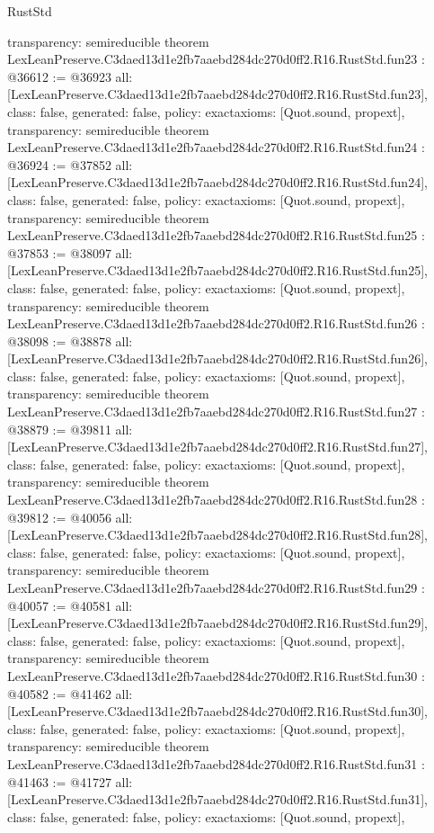 \begin{lexlean}{RustStd}
\begin{coremodule}
{  transparency: semireducible
}
theorem LexLeanPreserve.C3daed13d1e2fb7aaebd284dc270d0ff2.R16.RustStd.fun23 : @36612 := @36923 {
  all: [LexLeanPreserve.C3daed13d1e2fb7aaebd284dc270d0ff2.R16.RustStd.fun23],
  class: false,
  generated: false,
  policy: exact{axioms: [Quot.sound, propext]},
  transparency: semireducible
}
theorem LexLeanPreserve.C3daed13d1e2fb7aaebd284dc270d0ff2.R16.RustStd.fun24 : @36924 := @37852 {
  all: [LexLeanPreserve.C3daed13d1e2fb7aaebd284dc270d0ff2.R16.RustStd.fun24],
  class: false,
  generated: false,
  policy: exact{axioms: [Quot.sound, propext]},
  transparency: semireducible
}
theorem LexLeanPreserve.C3daed13d1e2fb7aaebd284dc270d0ff2.R16.RustStd.fun25 : @37853 := @38097 {
  all: [LexLeanPreserve.C3daed13d1e2fb7aaebd284dc270d0ff2.R16.RustStd.fun25],
  class: false,
  generated: false,
  policy: exact{axioms: [Quot.sound, propext]},
  transparency: semireducible
}
theorem LexLeanPreserve.C3daed13d1e2fb7aaebd284dc270d0ff2.R16.RustStd.fun26 : @38098 := @38878 {
  all: [LexLeanPreserve.C3daed13d1e2fb7aaebd284dc270d0ff2.R16.RustStd.fun26],
  class: false,
  generated: false,
  policy: exact{axioms: [Quot.sound, propext]},
  transparency: semireducible
}
theorem LexLeanPreserve.C3daed13d1e2fb7aaebd284dc270d0ff2.R16.RustStd.fun27 : @38879 := @39811 {
  all: [LexLeanPreserve.C3daed13d1e2fb7aaebd284dc270d0ff2.R16.RustStd.fun27],
  class: false,
  generated: false,
  policy: exact{axioms: [Quot.sound, propext]},
  transparency: semireducible
}
theorem LexLeanPreserve.C3daed13d1e2fb7aaebd284dc270d0ff2.R16.RustStd.fun28 : @39812 := @40056 {
  all: [LexLeanPreserve.C3daed13d1e2fb7aaebd284dc270d0ff2.R16.RustStd.fun28],
  class: false,
  generated: false,
  policy: exact{axioms: [Quot.sound, propext]},
  transparency: semireducible
}
theorem LexLeanPreserve.C3daed13d1e2fb7aaebd284dc270d0ff2.R16.RustStd.fun29 : @40057 := @40581 {
  all: [LexLeanPreserve.C3daed13d1e2fb7aaebd284dc270d0ff2.R16.RustStd.fun29],
  class: false,
  generated: false,
  policy: exact{axioms: [Quot.sound, propext]},
  transparency: semireducible
}
theorem LexLeanPreserve.C3daed13d1e2fb7aaebd284dc270d0ff2.R16.RustStd.fun30 : @40582 := @41462 {
  all: [LexLeanPreserve.C3daed13d1e2fb7aaebd284dc270d0ff2.R16.RustStd.fun30],
  class: false,
  generated: false,
  policy: exact{axioms: [Quot.sound, propext]},
  transparency: semireducible
}
theorem LexLeanPreserve.C3daed13d1e2fb7aaebd284dc270d0ff2.R16.RustStd.fun31 : @41463 := @41727 {
  all: [LexLeanPreserve.C3daed13d1e2fb7aaebd284dc270d0ff2.R16.RustStd.fun31],
  class: false,
  generated: false,
  policy: exact{axioms: [Quot.sound, propext]},
}
\end{coremodule}
\end{lexlean}
